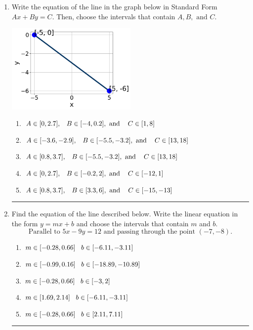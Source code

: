 \documentclass[14pt]{extbook}
\newcommand{\litem}[1]{\item#1\hspace*{-1cm}\rule{\textwidth}{0.4pt}}
\begin{document}
\begin{enumerate}
{\begin{enumerate}[label=\Alph*.]
\end{enumerate} }
\litem{
Write the equation of the line in the graph below in Standard Form $Ax+By=C$. Then, choose the intervals that contain $A, B, \text{ and } C$.
\begin{center}
    \includegraphics[width=0.5\textwidth]{../Figures/linearGraphToStandardCopyC.png}
\end{center}
\begin{enumerate}[label=\Alph*.]
\item \( A \in [0, 2.7], \hspace{3mm} B \in [-4, 0.2], \text{ and } \hspace{3mm} C \in [1, 8] \)
\item \( A \in [-3.6, -2.9], \hspace{3mm} B \in [-5.5, -3.2], \text{ and } \hspace{3mm} C \in [13, 18] \)
\item \( A \in [0.8, 3.7], \hspace{3mm} B \in [-5.5, -3.2], \text{ and } \hspace{3mm} C \in [13, 18] \)
\item \( A \in [0, 2.7], \hspace{3mm} B \in [-0.2, 2], \text{ and } \hspace{3mm} C \in [-12, 1] \)
\item \( A \in [0.8, 3.7], \hspace{3mm} B \in [3.3, 6], \text{ and } \hspace{3mm} C \in [-15, -13] \)

\end{enumerate} }
\litem{
Find the equation of the line described below. Write the linear equation in the form $ y=mx+b $ and choose the intervals that contain $m$ and $b$.\[ \text{Parallel to } 5 x - 9 y = 12 \text{ and passing through the point } (-7, -8). \]\begin{enumerate}[label=\Alph*.]
\item \( m \in [-0.28, 0.66] \hspace*{3mm} b \in [-6.11, -3.11] \)
\item \( m \in [-0.99, 0.16] \hspace*{3mm} b \in [-18.89, -10.89] \)
\item \( m \in [-0.28, 0.66] \hspace*{3mm} b \in [-3, 2] \)
\item \( m \in [1.69, 2.14] \hspace*{3mm} b \in [-6.11, -3.11] \)
\item \( m \in [-0.28, 0.66] \hspace*{3mm} b \in [2.11, 7.11] \)


\end{enumerate}}
\end{enumerate}
\end{document}
